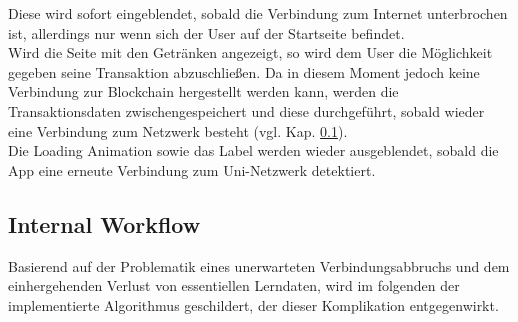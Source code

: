 Diese wird sofort eingeblendet, sobald die Verbindung zum Internet unterbrochen ist, allerdings nur wenn sich der User auf der Startseite befindet. \\
Wird die Seite mit den Getränken angezeigt, so wird dem User die Möglichkeit gegeben seine Transaktion abzuschließen. Da in diesem Moment jedoch keine Verbindung zur Blockchain hergestellt werden kann, werden die Transaktionsdaten zwischengespeichert und diese durchgeführt, sobald wieder eine Verbindung zum Netzwerk besteht (vgl. Kap. \ref{subsec:internalFlow}).\\
Die Loading Animation sowie das  Label werden wieder ausgeblendet, sobald die App eine erneute Verbindung zum Uni-Netzwerk detektiert.

\subsection{Internal Workflow}
\label{subsec:internalFlow}
Basierend auf der Problematik eines unerwarteten Verbindungsabbruchs und dem einhergehenden Verlust von essentiellen Lerndaten, wird im folgenden der implementierte Algorithmus geschildert, der dieser Komplikation entgegenwirkt. 

